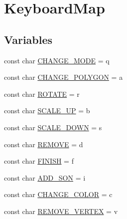 \hypertarget{group___keyboard_map}{}\section{Keyboard\+Map}
\label{group___keyboard_map}
\subsection*{Variables}
\begin{DoxyCompactItemize}
\item 
const char \hyperlink{group___keyboard_map_ga19e19571f1f477319c5b65d823f8067e}{C\+H\+A\+N\+G\+E\+\_\+\+M\+O\+D\+E} = \textquotesingle{}q\textquotesingle{}
\item 
const char \hyperlink{group___keyboard_map_ga6117f2740efee651caa6f96887bd3ae5}{C\+H\+A\+N\+G\+E\+\_\+\+P\+O\+L\+Y\+G\+O\+N} = \textquotesingle{}a\textquotesingle{}
\item 
const char \hyperlink{group___keyboard_map_ga220657e3f7ae7c0030a20f5784a81432}{R\+O\+T\+A\+T\+E} = \textquotesingle{}r\textquotesingle{}
\item 
const char \hyperlink{group___keyboard_map_ga57f6445073d04904d4a3315db885270c}{S\+C\+A\+L\+E\+\_\+\+U\+P} = \textquotesingle{}b\textquotesingle{}
\item 
const char \hyperlink{group___keyboard_map_ga1c9377daff9f5f13e998137e70ea7d05}{S\+C\+A\+L\+E\+\_\+\+D\+O\+W\+N} = \textquotesingle{}s\textquotesingle{}
\item 
const char \hyperlink{group___keyboard_map_ga30edd29ec1ca0ef12d97fafb281f5cd5}{R\+E\+M\+O\+V\+E} = \textquotesingle{}d\textquotesingle{}
\item 
const char \hyperlink{group___keyboard_map_gab55582ef04f6dccb70ffada359e65b7b}{F\+I\+N\+I\+S\+H} = \textquotesingle{}f\textquotesingle{}
\item 
const char \hyperlink{group___keyboard_map_gaf403811a703b2056718fb8d044d13c1d}{A\+D\+D\+\_\+\+S\+O\+N} = \textquotesingle{}i\textquotesingle{}
\item 
const char \hyperlink{group___keyboard_map_ga87084941f950b48e78d2988a0d9c6506}{C\+H\+A\+N\+G\+E\+\_\+\+C\+O\+L\+O\+R} = \textquotesingle{}c\textquotesingle{}
\item 
const char \hyperlink{group___keyboard_map_ga163cf00cd722f47f7cb97ad82d287e20}{R\+E\+M\+O\+V\+E\+\_\+\+V\+E\+R\+T\+E\+X} = \textquotesingle{}v\textquotesingle{}
\end{DoxyCompactItemize}


